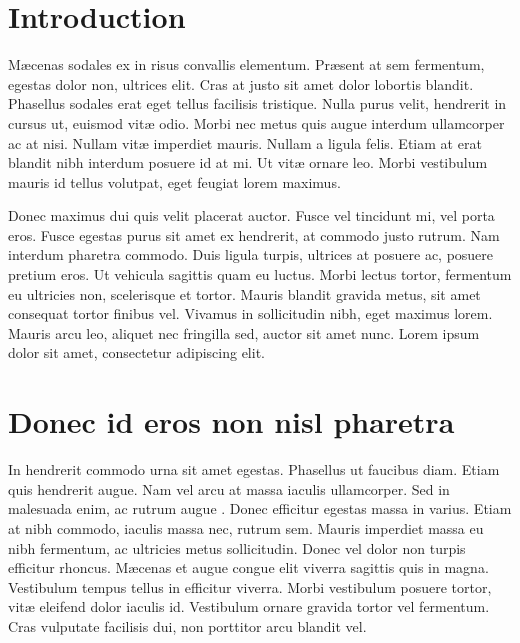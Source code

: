 \section{Introduction} %

M\ae{}cenas sodales ex in risus convallis elementum. Pr\ae{}sent at sem fermentum, egestas dolor non, ultrices elit. Cras at justo sit amet dolor lobortis blandit. Phasellus sodales erat eget tellus facilisis tristique. Nulla purus velit, hendrerit in cursus ut, euismod vit\ae{} odio. Morbi nec metus quis augue interdum ullamcorper ac at nisi. Nullam vit\ae{} imperdiet mauris. Nullam a ligula felis. Etiam at erat blandit nibh interdum posuere id at mi. Ut vit\ae{} ornare leo. Morbi vestibulum mauris id tellus volutpat, eget feugiat lorem maximus.

Donec maximus dui quis velit placerat auctor. Fusce vel tincidunt mi, vel porta eros. Fusce egestas purus sit amet ex hendrerit, at commodo justo rutrum. Nam interdum pharetra commodo. Duis ligula turpis, ultrices at posuere ac, posuere pretium eros. Ut vehicula sagittis quam eu luctus. Morbi lectus tortor, fermentum eu ultricies non, scelerisque et tortor. Mauris blandit gravida metus, sit amet consequat tortor finibus vel. Vivamus in sollicitudin nibh, eget maximus lorem. Mauris arcu leo, aliquet nec fringilla sed, auctor sit amet nunc. Lorem ipsum dolor sit amet, consectetur adipiscing elit. 


\section{Donec id eros non nisl pharetra} %

In hendrerit commodo urna sit amet egestas. Phasellus ut faucibus diam. Etiam quis hendrerit augue. Nam vel arcu at massa iaculis ullamcorper. Sed in malesuada enim, ac rutrum augue \cite{DBLP:journals/ai/Lenat83a}. Donec efficitur egestas massa in varius. Etiam at nibh commodo, iaculis massa nec, rutrum sem. Mauris imperdiet massa eu nibh fermentum, ac ultricies metus sollicitudin. Donec vel dolor non turpis efficitur rhoncus. M\ae{}cenas et augue congue elit viverra sagittis quis in magna. Vestibulum tempus tellus in efficitur viverra. Morbi vestibulum posuere tortor, vit\ae{} eleifend dolor iaculis id. Vestibulum ornare gravida tortor vel fermentum. Cras vulputate facilisis dui, non porttitor arcu blandit vel.

